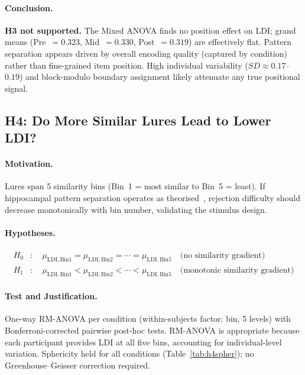 \documentclass[10pt,a4paper]{article}
\begin{document}
\paragraph{Conclusion.}
\textbf{H3 not supported.} The Mixed ANOVA finds no position effect on LDI; grand means (Pre~$=0.323$, Mid~$=0.330$, Post~$=0.319$) are effectively flat. Pattern separation appears driven by overall encoding quality (captured by condition) rather than fine-grained item position. High individual variability ($SD{\approx}0.17$--$0.19$) and block-modulo boundary assignment likely attenuate any true positional signal.

\subsection*{H4: Do More Similar Lures Lead to Lower LDI?}

\paragraph{Motivation.}
Lures span 5 similarity bins (Bin~1 = most similar to Bin~5 = least). If hippocampal pattern separation operates as theorised~\cite{bakker2008}, rejection difficulty should decrease monotonically with bin number, validating the stimulus design.

\paragraph{Hypotheses.}
\begin{align*}
  H_0 &:\quad \mu_{\mathrm{LDI,Bin1}} = \mu_{\mathrm{LDI,Bin2}} = \cdots = \mu_{\mathrm{LDI,Bin5}}
        \quad \text{(no similarity gradient)} \\
  H_1 &:\quad \mu_{\mathrm{LDI,Bin1}} < \mu_{\mathrm{LDI,Bin2}} < \cdots < \mu_{\mathrm{LDI,Bin5}}
        \quad \text{(monotonic similarity gradient)}
\end{align*}

\paragraph{Test and Justification.}
One-way RM-ANOVA per condition (within-subjects factor: bin, 5 levels) with Bonferroni-corrected pairwise post-hoc tests. RM-ANOVA is appropriate because each participant provides LDI at all five bins, accounting for individual-level variation. Sphericity held for all conditions (Table~\ref{tab:h4spher}); no Greenhouse--Geisser correction required.
\end{document}
